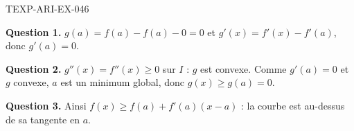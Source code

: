\begin{corrige}{TEXP-ARI-EX-046}

\textbf{Question 1.} $g(a) = f(a) - f(a) - 0 = 0$ et $g'(x) = f'(x) - f'(a)$, donc $g'(a) = 0$.


\textbf{Question 2.} $g''(x) = f''(x) \geq 0$ sur $I$ : $g$ est convexe. Comme $g'(a) = 0$ et $g$ convexe, $a$ est un minimum global, donc $g(x) \geq g(a) = 0$.

\textbf{Question 3.} Ainsi $f(x) \geq f(a) + f'(a)(x-a)$ : la courbe est au-dessus de sa tangente en $a$.

\end{corrige}
